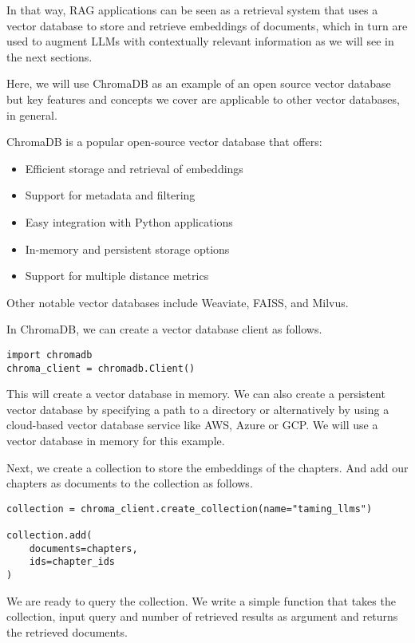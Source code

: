 In that way, RAG applications can be seen as a retrieval system that uses a vector database to store and retrieve embeddings of documents, which in turn are used to augment LLMs with contextually relevant information as we will see in the next sections.

Here, we will use ChromaDB  as an example of an open source vector database but key features and concepts we cover are applicable to other vector databases, in general.

ChromaDB is a popular open-source vector database that offers:
\begin{itemize}
    \item Efficient storage and retrieval of embeddings
    \item Support for metadata and filtering
    \item Easy integration with Python applications
    \item In-memory and persistent storage options
    \item Support for multiple distance metrics
\end{itemize}

Other notable vector databases include Weaviate, FAISS, and Milvus.

In ChromaDB, we can create a vector database client as follows.

\begin{verbatim}
import chromadb
chroma_client = chromadb.Client()
\end{verbatim}

This will create a vector database in memory. We can also create a persistent vector database by specifying a path to a directory or alternatively by using a cloud-based vector database service like AWS, Azure or GCP. We will use a vector database in memory for this example.

Next, we create a collection to store the embeddings of the chapters. And add our chapters as documents to the collection as follows.

\begin{verbatim}
collection = chroma_client.create_collection(name="taming_llms")

collection.add(
    documents=chapters,
    ids=chapter_ids
)
\end{verbatim}

We are ready to query the collection. We write a simple function that takes the collection, input query and number of retrieved results as argument and returns the retrieved documents.

